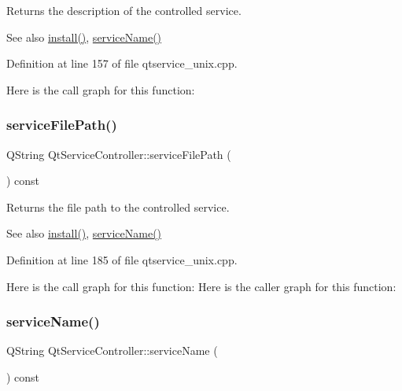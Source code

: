 Returns the description of the controlled service.

\begin{DoxySeeAlso}{See also}
\mbox{\hyperlink{class_qt_service_controller_a7e2b85e911ff152557dd25959e76094b}{install()}}, \mbox{\hyperlink{class_qt_service_controller_a3df972ecd01a00fff5cda316ae35cbea}{service\+Name()}} 
\end{DoxySeeAlso}


Definition at line 157 of file qtservice\+\_\+unix.\+cpp.

Here is the call graph for this function\+:
\mbox{\label{class_qt_service_controller_a5ab709fdeb3ab526c92ccbbe1b2706c6}} 
\subsubsection{\texorpdfstring{service\+File\+Path()}{serviceFilePath()}}
{\footnotesize\ttfamily Q\+String Qt\+Service\+Controller\+::service\+File\+Path (\begin{DoxyParamCaption}{ }\end{DoxyParamCaption}) const}

Returns the file path to the controlled service.

\begin{DoxySeeAlso}{See also}
\mbox{\hyperlink{class_qt_service_controller_a7e2b85e911ff152557dd25959e76094b}{install()}}, \mbox{\hyperlink{class_qt_service_controller_a3df972ecd01a00fff5cda316ae35cbea}{service\+Name()}} 
\end{DoxySeeAlso}


Definition at line 185 of file qtservice\+\_\+unix.\+cpp.

Here is the call graph for this function\+:
Here is the caller graph for this function\+:
\mbox{\label{class_qt_service_controller_a3df972ecd01a00fff5cda316ae35cbea}} 
\subsubsection{\texorpdfstring{service\+Name()}{serviceName()}}
{\footnotesize\ttfamily Q\+String Qt\+Service\+Controller\+::service\+Name (\begin{DoxyParamCaption}{ }\end{DoxyParamCaption}) const}

